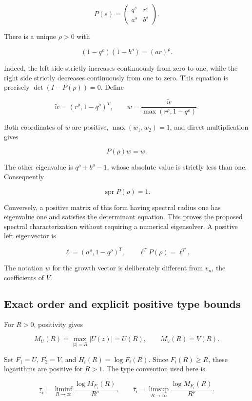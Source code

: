 \[
P(s)=\begin{pmatrix}q^s&r^s\\a^s&b^s\end{pmatrix}.
\]

There is a unique \(\rho>0\) with

\[
\boxed{(1-q^\rho)(1-b^\rho)=(ar)^\rho.}
\]

Indeed, the left side strictly increases continuously from zero to one,
while the right side strictly decreases continuously from one to zero.
This equation is precisely \(\det(I-P(\rho))=0\). Define

\[
\widetilde w=(r^\rho,1-q^\rho)^T,
\qquad
w=\frac{\widetilde w}{\max(r^\rho,1-q^\rho)}.
\]

Both coordinates of \(w\) are positive, \(\max(w_1,w_2)=1\), and direct
multiplication gives

\[
P(\rho)w=w.
\]

The other eigenvalue is \(q^\rho+b^\rho-1\), whose absolute value is
strictly less than one. Consequently

\[
\boxed{\operatorname{spr}P(\rho)=1.}
\]

Conversely, a positive matrix of this form having spectral radius one
has eigenvalue one and satisfies the determinant equation. This proves
the proposed spectral characterization without requiring a numerical
eigensolver. A positive left eigenvector is

\[
\ell=(a^\rho,1-q^\rho)^T,\qquad \ell^TP(\rho)=\ell^T.
\]

The notation \(w\) for the growth vector is deliberately different from
\(v_n\), the coefficients of \(V\).

\hypertarget{v11-coupled_growth_full-exact-order-and-explicit-positive-type-bounds}{%
\subsection{Exact order and explicit positive type
bounds}\label{v11-coupled_growth_full-exact-order-and-explicit-positive-type-bounds}}

For \(R>0\), positivity gives

\[
M_U(R)=\max_{|z|=R}|U(z)|=U(R),\qquad
M_V(R)=V(R).
\]

Set \(F_1=U\), \(F_2=V\), and \(H_i(R)=\log F_i(R)\). Since
\(F_i(R)\ge R\), these logarithms are positive for \(R>1\). The type
convention used here is

\[
\underline\tau_i=\liminf_{R\to\infty}\frac{\log M_{F_i}(R)}{R^\rho},
\qquad
\overline\tau_i=\limsup_{R\to\infty}\frac{\log M_{F_i}(R)}{R^\rho}.
\]

